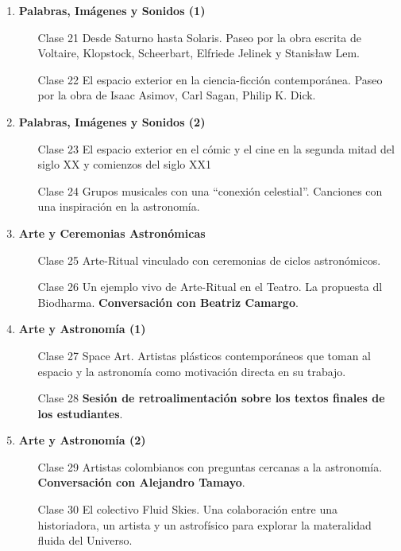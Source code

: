 \documentclass[12pt]{report}
\begin{document}
\begin{enumerate}
\item {\bf Palabras, Im\'agenes y Sonidos (1)}
\begin{itemize}
\item[Clase 21] Desde Saturno hasta Solaris. Paseo por la obra escrita
  de Voltaire, Klopstock, Scheerbart, Elfriede Jelinek y Stanis\l aw Lem.
\item[Clase 22] El espacio exterior en la ciencia-ficci\'on
  contempor\'anea. Paseo por la obra de Isaac Asimov, Carl Sagan,
  Philip K. Dick. 
\end{itemize}

\item {\bf Palabras, Im\'agenes y Sonidos (2)}
\begin{itemize}
\item[Clase 23] El espacio exterior en el c\'omic y el cine en la
  segunda mitad del siglo XX y comienzos del siglo XX1 
\item[Clase 24] Grupos musicales con una ``conexi\'on
  celestial''. Canciones con una inspiraci\'on en la astronom\'ia.   
\end{itemize}

\item {\bf Arte y Ceremonias Astron\'omicas}
\begin{itemize}
\item[Clase 25] Arte-Ritual vinculado con ceremonias de ciclos astron\'omicos.
\item[Clase 26] Un ejemplo vivo de Arte-Ritual en el Teatro. La
  propuesta dl Biodharma. {\bf Conversaci\'on con Beatriz Camargo}. 
\end{itemize}

\item {\bf Arte y Astronom\'ia (1)}
\begin{itemize}
\item[Clase 27] Space Art. Artistas pl\'asticos contempor\'aneos que toman al
  espacio y la astronom\'ia como motivaci\'on directa en su trabajo. 
\item[Clase 28]   {\bf Sesi\'on de retroalimentaci\'on sobre los
  textos finales de los estudiantes}. 
\end{itemize}

\item {\bf Arte y Astronom\'ia (2)}
\begin{itemize}
\item[Clase 29] Artistas colombianos con preguntas cercanas a la
  astronom\'ia. {\bf Conversaci\'on con Alejandro Tamayo}.
\item[Clase 30] El colectivo Fluid Skies. Una colaboraci\'on entre una
  historiadora, un artista y un astrof\'isico para explorar la
  materalidad fluida del Universo.
\end{itemize}

\end{enumerate}
\end{document}
